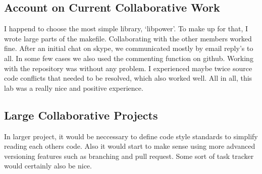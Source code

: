 \documentclass[a4paper,11pt,twoside]{article}
\begin{document}
\subsection{Account on Current Collaborative Work}
I happend to choose the most simple library, `libpower'. To make up for that, I wrote large parts of the makefile. Collaborating with the other members worked fine. After an initial chat on skype, we communicated mostly by email reply's to all. In some few cases we also used the commenting function on github. Working with the repository was without any problem. I experienced maybe twice source code conflicts that needed to be resolved, which also worked well. All in all, this lab was a really nice and positive experience.

\subsection{Large Collaborative Projects}
In larger project, it would be neccessary to define code style standards to simplify reading each others code. Also it would start to make sense using more advanced versioning features such as branching and pull request. Some sort of task tracker would certainly also be nice.

%
\end{document}
